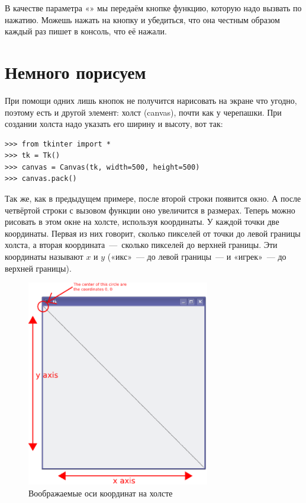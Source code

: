 В качестве параметра «» мы передаём кнопке функцию, которую надо вызвать по нажатию. Можешь нажать на кнопку и убедиться, что она честным образом каждый раз пишет в консоль, что её нажали.

\section{Немного порисуем}

При помощи одних лишь кнопок не получится нарисовать на экране что угодно, поэтому  есть и другой элемент: холст (canvas), почти как у черепашки. При создании холста надо указать его ширину и высоту, вот так:

\begin{listing}
\begin{verbatim}
>>> from tkinter import *
>>> tk = Tk()
>>> canvas = Canvas(tk, width=500, height=500)
>>> canvas.pack()
\end{verbatim}
\end{listing}

Так же, как в предыдущем примере, после второй строки появится окно. А после четвёртой строки с вызовом функции  оно увеличится в размерах. Теперь можно рисовать в этом окне на холсте, используя координаты. У каждой точки две координаты. Первая из них говорит, сколько пикселей от точки до левой границы холста, а вторая координата — сколько пикселей до верхней границы. Эти координаты называют $x$ и $y$ («икс» — до левой границы — и «игрек» — до верхней границы).

\begin{figure}
\begin{center}
\includegraphics[width=80mm]{../en/figure32.eps}
\end{center}
\caption{Воображаемые оси координат на холсте}\label{fig32}
\end{figure}


